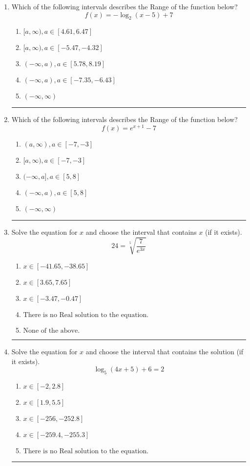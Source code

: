 \documentclass[14pt]{extbook}
\newcommand{\litem}[1]{\item#1\hspace*{-1cm}\rule{\textwidth}{0.4pt}}
\begin{document}
\begin{enumerate}
{\begin{enumerate}[label=\Alph*.]
\end{enumerate} }
\litem{
Which of the following intervals describes the Range of the function below?\[ f(x) = -\log_2{(x-5)}+7 \]\begin{enumerate}[label=\Alph*.]
\item \( [a, \infty), a \in [4.61, 6.47] \)
\item \( [a, \infty), a \in [-5.47, -4.32] \)
\item \( (-\infty, a), a \in [5.78, 8.19] \)
\item \( (-\infty, a), a \in [-7.35, -6.43] \)
\item \( (-\infty, \infty) \)

\end{enumerate} }
\litem{
Which of the following intervals describes the Range of the function below?\[ f(x) = e^{x+1}-7 \]\begin{enumerate}[label=\Alph*.]
\item \( (a, \infty), a \in [-7, -3] \)
\item \( [a, \infty), a \in [-7, -3] \)
\item \( (-\infty, a], a \in [5, 8] \)
\item \( (-\infty, a), a \in [5, 8] \)
\item \( (-\infty, \infty) \)

\end{enumerate} }
\litem{
 Solve the equation for $x$ and choose the interval that contains $x$ (if it exists).\[  24 = \sqrt[5]{\frac{7}{e^{3x}}} \]\begin{enumerate}[label=\Alph*.]
\item \( x \in [-41.65, -38.65] \)
\item \( x \in [3.65, 7.65] \)
\item \( x \in [-3.47, -0.47] \)
\item \( \text{There is no Real solution to the equation.} \)
\item \( \text{None of the above.} \)

\end{enumerate} }
\litem{
Solve the equation for $x$ and choose the interval that contains the solution (if it exists).\[ \log_{5}{(4x+5)}+6 = 2 \]\begin{enumerate}[label=\Alph*.]
\item \( x \in [-2, 2.8] \)
\item \( x \in [1.9, 5.5] \)
\item \( x \in [-256, -252.8] \)
\item \( x \in [-259.4, -255.3] \)
\item \( \text{There is no Real solution to the equation.} \)


\end{enumerate}}
\end{enumerate}
\end{document}
